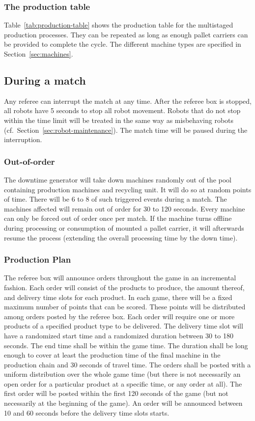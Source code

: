 \documentclass[12pt,twoside]{article}
\newcommand{\refsec}[1]{Section~\ref{#1}}
\begin{document}
\subsubsection{The production table}
Table~\ref{tab:production-table} shows the production table for the
multistaged production processes. They can be repeated as long as
enough pallet carriers can be provided to complete the cycle. The
different machine types are specified in Section~\ref{sec:machines}.

\subsection{During a match}
\label{sec:during-match}
Any referee can interrupt the match at any time. After the referee box
is stopped, all robots have 5 seconds to stop all robot movement.
Robots that do not stop within the time limit will be treated in the
same way as misbehaving robots (cf.~\refsec{sec:robot-maintenance}).
The match time will be paused during the interruption.

\subsubsection{Out-of-order}
\label{sec:out-of-order}
The downtime generator will take down machines randomly out of the
pool containing production machines and recycling unit. It will do so
at random points of time. There will be 6 to 8 of such triggered
events during a match. The machines affected will remain out of order
for 30 to 120 seconds. Every machine can only be forced out of order
once per match. If the machine turns offline during processing or
consumption of mounted a pallet carrier, it will afterwards resume the
process (extending the overall processing time by the down time).

\subsubsection{Production Plan}
The referee box will announce orders throughout the game in an
incremental fashion. Each order will consist of the products to
produce, the amount thereof, and delivery time slots for each
product. In each game, there will be a fixed maximum number of points
that can be scored.  These points will be
distributed among orders posted by the referee box. Each order will
require one or more products of a specified product type to be
delivered. The delivery time slot will have a randomized start time
and a randomized duration between 30 to 180 seconds. The end time
shall be within the game time. The duration shall be long enough to
cover at least the production time of the final machine in the
production chain and 30 seconds of travel time. The orders shall be
posted with a uniform distribution over the whole game time (but there
is not necessarily an open order for a particular product at a
specific time, or any order at all). The first order will be posted
within the first 120 seconds of the game (but not necessarily at the
beginning of the game). An order will be announced between 10 and 60
seconds before the delivery time slots starts.
\end{document}
